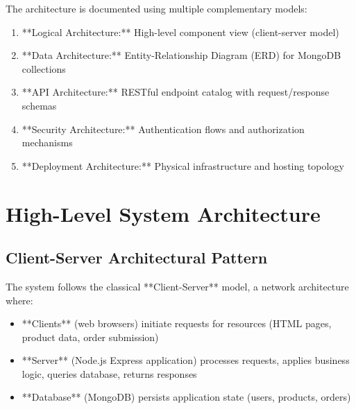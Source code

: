 The architecture is documented using multiple complementary models:
\begin{enumerate}
    \item **Logical Architecture:** High-level component view (client-server model)
    \item **Data Architecture:** Entity-Relationship Diagram (ERD) for MongoDB collections
    \item **API Architecture:** RESTful endpoint catalog with request/response schemas
    \item **Security Architecture:** Authentication flows and authorization mechanisms
    \item **Deployment Architecture:** Physical infrastructure and hosting topology
\end{enumerate}

\section{High-Level System Architecture}

\subsection{Client-Server Architectural Pattern}

The system follows the classical **Client-Server** model, a network architecture where:
\begin{itemize}
    \item **Clients** (web browsers) initiate requests for resources (HTML pages, product data, order submission)
    \item **Server** (Node.js Express application) processes requests, applies business logic, queries database, returns responses
    \item **Database** (MongoDB) persists application state (users, products, orders)
\end{itemize}

